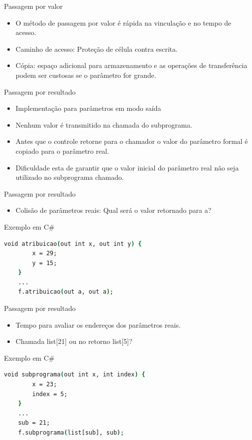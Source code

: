 \begin{frame}[fragile]{Passagem por valor}
	\begin{itemize}
	  \item O método de passagem por valor é rápida na vinculação e no tempo de acesso.
	  \item Caminho de acesso: Proteção de célula contra escrita.
	  \item Cópia: espaço adicional para armazenamento e as operações de transferência podem ser custosas se o parâmetro for grande.
	\end{itemize}
\end{frame}

\begin{frame}[fragile]{Passagem por resultado}
	\begin{itemize}
	  \item Implementação para parâmetros em modo saída
	  \item Nenhum valor é transmitido na chamada do subprograma.
	  \item Antes que o controle retorne para o chamador o valor do parâmetro formal é copiado para o parâmetro real.
	  \item Dificuldade esta de garantir que o valor inicial do parâmetro real não seja utilizado no subprograma chamado.
	\end{itemize}
\end{frame}

\begin{frame}[fragile]{Passagem por resultado}
	\begin{itemize}
	  \item Colisão de parâmetros reais: Qual será o valor retornado para a?
	\end{itemize}
	Exemplo em C\#
	\begin{lstlisting}[language=csh]
	void atribuicao(out int x, out int y) {
	    x = 29;
	    y = 15;
	}
	...
	f.atribuicao(out a, out a);
	\end{lstlisting}
\end{frame}

\begin{frame}[fragile]{Passagem por resultado}
	\begin{itemize}
	  \item Tempo para avaliar os endereços dos parâmetros reais.
	  \item Chamada list[21] ou no retorno list[5]?
	\end{itemize}
	Exemplo em C\#
	\begin{lstlisting}[language=csh]
	void subprograma(out int x, int index) {
	    x = 23;
	    index = 5;
	}
	...
	sub = 21;
	f.subprograma(list[sub], sub);
	\end{lstlisting}
\end{frame}

